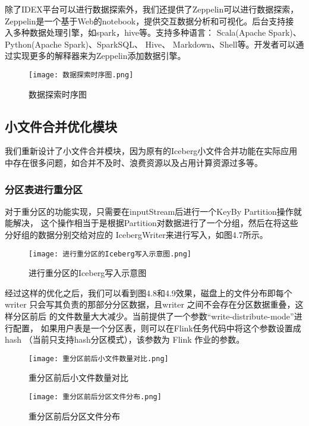 除了IDEX平台可以进行数据探索外，我们还提供了Zeppelin可以进行数据探索，
Zeppelin是一个基于Web的notebook，提供交互数据分析和可视化。后台支持接
入多种数据处理引擎，如spark，hive等。支持多种语言： Scala(Apache Spark)、
Python(Apache Spark)、SparkSQL、 Hive、 Markdown、Shell等。开发者可以通过实现更多的解释器来为Zeppelin添加数据引擎。

\begin{figure}[h]
  \centering
  \texttt{[image: 数据探索时序图.png]}
  \caption{数据探索时序图}
  \label{fig:badge}
\end{figure}

\subsection{小文件合并优化模块}

我们重新设计了小文件合并模块，因为原有的Iceberg小文件合并功能在实际应用中存在很多问题，如合并不及时、浪费资源以及占用计算资源过多等。

\subsubsection{分区表进行重分区}

对于重分区的功能实现，只需要在inputStream后进行一个KeyBy Partition操作就能解决，
这个操作相当于是根据Partition对数据进行了一个分组，然后在将这些分好组的数据分别交给对应的
IcebergWriter来进行写入，如图4.7所示。

\begin{figure}[h]
  \centering
  \texttt{[image: 进行重分区的Iceberg写入示意图.png]}
  \caption{进行重分区的Iceberg写入示意图}
  \label{fig:badge}
\end{figure}

经过这样的优化之后，我们可以看到图4.8和4.9效果，磁盘上的文件分布即每个writer
只会写其负责的那部分分区数据，且writer 之间不会存在分区数据重叠，这样分区前后
的文件数量大大减少。当前提供了一个参数“write-distribute-mode”进行配置，
如果用户表是一个分区表，则可以在Flink任务代码中将这个参数设置成hash
（当前只支持hash分区模式），该参数为 Flink 作业的参数。

\begin{figure}[h]
  \centering
  \texttt{[image: 重分区前后小文件数量对比.png]}
  \caption{重分区前后小文件数量对比}
  \label{fig:badge}
\end{figure}

\begin{figure}[h]
  \centering
  \texttt{[image: 重分区前后分区文件分布.png]}
  \caption{重分区前后分区文件分布}
  \label{fig:badge}
\end{figure}

